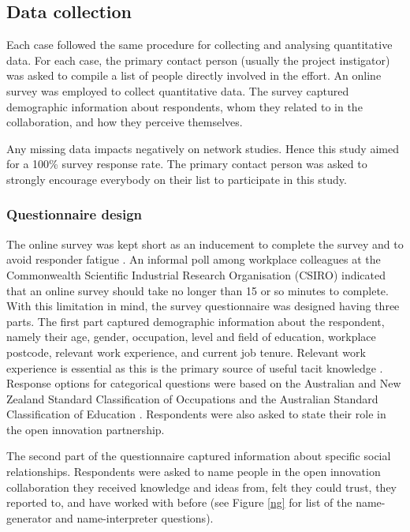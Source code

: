 \subsection{Data collection}

Each case followed the same procedure for collecting and analysing quantitative data. For each case, the primary contact person (usually the project instigator) was asked to compile a list of people directly involved in the effort. An online survey was employed to collect quantitative data. The survey captured demographic information about respondents, whom they related to in the collaboration, and how they perceive themselves.\medskip

Any missing data impacts negatively on network studies. Hence this study aimed for a 100\% survey response rate. The primary contact person was asked to strongly encourage everybody on their list to participate in this study. 

\subsubsection{Questionnaire design}

The online survey was kept short as an inducement to complete the survey and to avoid responder fatigue \citep{crawford2001web,evans2005value,van2006conducting}. An informal poll among workplace colleagues at the Commonwealth Scientific Industrial Research Organisation (CSIRO) indicated that an online survey should take no longer than 15 or so minutes to complete. With this limitation in mind, the survey questionnaire was designed having three parts. The first part captured demographic information about the respondent, namely their age, gender, occupation, level and field of education, workplace postcode, relevant work experience, and current job tenure. Relevant work experience is essential as this is the primary source of useful tacit knowledge \citep{nonaka1995knowledge,sternberg1999tacit}. Response options for categorical questions were based on the Australian and New Zealand Standard Classification of Occupations \citep{pink2009anzsco} and the Australian Standard Classification of Education \citep{trewin2000australian}. Respondents were also asked to state their role in the open innovation partnership. \medskip

The second part of the questionnaire captured information about specific social relationships. Respondents were asked to name people in the open innovation collaboration they received knowledge and ideas from, felt they could trust, they reported to, and have worked with before (see Figure \ref{ng} for list of the name-generator and name-interpreter questions). \bigskip

